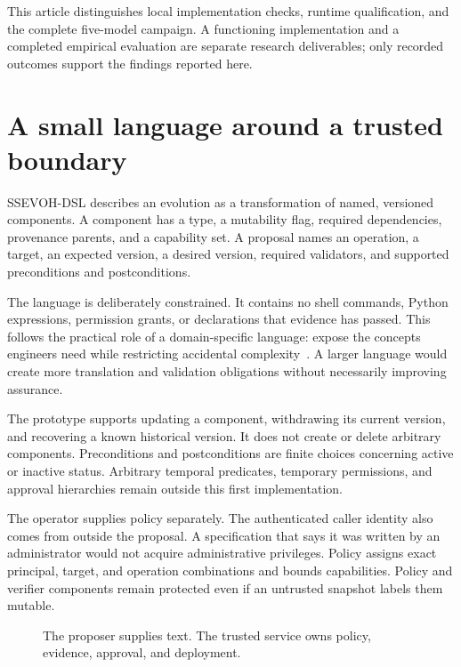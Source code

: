 \IfFileExists{IEEEcsmag.cls}{\publishertrue\documentclass{IEEEcsmag}}{\publisherfalse\documentclass[11pt]{article}}
\begin{document}
This article distinguishes local implementation checks, runtime qualification, and the complete five-model campaign. A functioning implementation and a completed empirical evaluation are separate research deliverables; only recorded outcomes support the findings reported here.

\section{A small language around a trusted boundary}
SSEVOH-DSL describes an evolution as a transformation of named, versioned components. A component has a type, a mutability flag, required dependencies, provenance parents, and a capability set. A proposal names an operation, a target, an expected version, a desired version, required validators, and supported preconditions and postconditions.

The language is deliberately constrained. It contains no shell commands, Python expressions, permission grants, or declarations that evidence has passed. This follows the practical role of a domain-specific language: expose the concepts engineers need while restricting accidental complexity~\cite{fowler2010}. A larger language would create more translation and validation obligations without necessarily improving assurance.

The prototype supports updating a component, withdrawing its current version, and recovering a known historical version. It does not create or delete arbitrary components. Preconditions and postconditions are finite choices concerning active or inactive status. Arbitrary temporal predicates, temporary permissions, and approval hierarchies remain outside this first implementation.

The operator supplies policy separately. The authenticated caller identity also comes from outside the proposal. A specification that says it was written by an administrator would not acquire administrative privileges. Policy assigns exact principal, target, and operation combinations and bounds capabilities. Policy and verifier components remain protected even if an untrusted snapshot labels them mutable.

\begin{figure}[t]
\centering
{}
\caption{The proposer supplies text. The trusted service owns policy, evidence, approval, and deployment.}
\end{figure}
\end{document}

